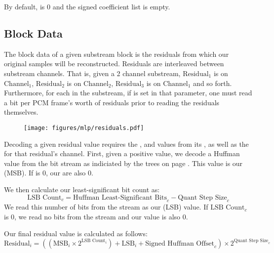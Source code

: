 By default,  is 0 and the signed coefficient list is empty.

\clearpage

\subsection{Block Data}

The block data of a given substream block is the residuals
from which our original samples will be reconstructed.
Residuals are interleaved between substream channels.
That is, given a 2 channel substream, $\text{Residual}_1$ is
on $\text{Channel}_1$, $\text{Residual}_2$ is on $\text{Channel}_2$,
$\text{Residual}_3$ is on $\text{Channel}_1$ and so forth.
Furthermore, for each  in the substream,
if  is set in that parameter,
one must read a  bit per PCM frame's worth of
residuals prior to reading the residuals themselves.

\begin{figure}[h]
\texttt{[image: figures/mlp/residuals.pdf]}
\end{figure}

Decoding a given residual value requires the
,  and
 values from its ,
as well as the  for that residual's channel.
First, given a positive  value, we decode a Huffman value
from the bit stream as indiciated by the trees on page
\pageref{mlp_codebooks}.
This value is our  (MSB).
If  is 0, our  are also 0.

We then calculate our least-significant bit count as:
\begin{equation*}
\text{LSB Count}_c = \text{Huffman Least-Significant Bits}_c - \text{Quant Step Size}_c
\end{equation*}
We read this number of bits from the stream as
our  (LSB) value.
If $\text{LSB Count}_c$ is 0, we read no bits from the stream and our
 value is also 0.

Our final residual value is calculated as follows:
\begin{equation*}
\text{Residual}_i = ((\text{MSB}_i \times 2 ^ {\text{LSB Count}_i}) + \text{LSB}_i + \text{Signed Huffman Offset}_c) \times 2 ^ {\text{Quant Step Size}_c}
\end{equation*}

